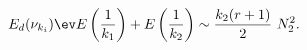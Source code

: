 \begin{equation} 
E_{d}(\nu_{k_{i}})\ev E\left( \frac{1}{k_{1}}\right)
+E\left(\frac{1}{k_{2}}\right)
\sim
\frac{k_{2}(r+1)}{2}\ N_2^{2}.
\end{equation}

